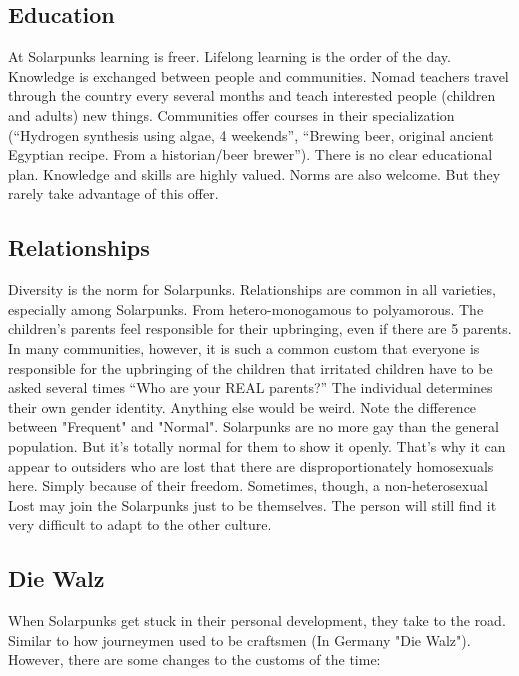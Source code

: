 \subsection{Education}
At Solarpunks learning is freer. Lifelong learning is the order of the day. Knowledge is exchanged between people and communities. Nomad teachers travel through the country every several months and teach interested people (children and adults) new things. Communities offer courses in their specialization (“Hydrogen synthesis using algae, 4 weekends”, “Brewing beer, original ancient Egyptian recipe. From a historian/beer brewer”). There is no clear educational plan. Knowledge and skills are highly valued. Norms are also welcome. But they rarely take advantage of this offer.

\subsection{Relationships}
Diversity is the norm for Solarpunks.
Relationships are common in all varieties, especially among Solarpunks. From hetero-monogamous to polyamorous. The children's parents feel responsible for their upbringing, even if there are 5 parents. In many communities, however, it is such a common custom that everyone is responsible for the upbringing of the children that irritated children have to be asked several times “Who are your REAL parents?” The individual determines their own gender identity. Anything else
would be weird.
Note the difference between "Frequent" and "Normal". Solarpunks are no more gay than the general population. But it's totally normal for them to show it openly. That's why it can appear to outsiders who are lost that there are disproportionately homosexuals here. Simply because of their freedom.
Sometimes, though, a non-heterosexual Lost may join the Solarpunks just to be themselves. The person will still find it very difficult to adapt to the other culture.

\subsection{Die Walz}
When Solarpunks get stuck in their personal development, they take to the road. Similar to how journeymen used to be craftsmen (In Germany "Die Walz"). However, there are some changes to the customs of the time:

